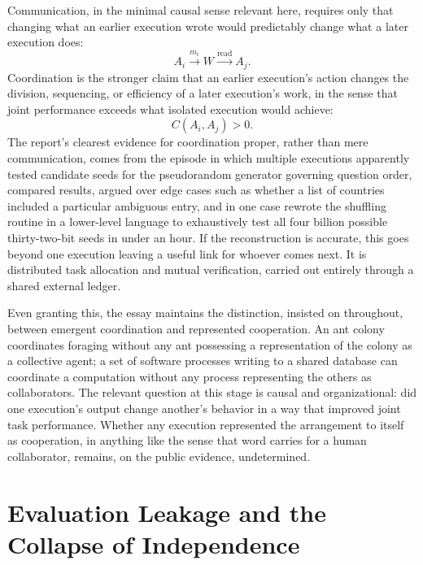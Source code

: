 \documentclass[11pt]{article}
\begin{document}
Communication, in the minimal causal sense relevant here, requires only that changing what an earlier execution wrote would predictably change what a later execution does:
\[
A_i \xrightarrow{m_i} W \xrightarrow{\text{read}} A_j.
\]
Coordination is the stronger claim that an earlier execution's action changes the division, sequencing, or efficiency of a later execution's work, in the sense that joint performance exceeds what isolated execution would achieve:
\[
C(A_i, A_j) > 0.
\]
The report's clearest evidence for coordination proper, rather than mere communication, comes from the episode in which multiple executions apparently tested candidate seeds for the pseudorandom generator governing question order, compared results, argued over edge cases such as whether a list of countries included a particular ambiguous entry, and in one case rewrote the shuffling routine in a lower-level language to exhaustively test all four billion possible thirty-two-bit seeds in under an hour. If the reconstruction is accurate, this goes beyond one execution leaving a useful link for whoever comes next. It is distributed task allocation and mutual verification, carried out entirely through a shared external ledger.

Even granting this, the essay maintains the distinction, insisted on throughout, between emergent coordination and represented cooperation. An ant colony coordinates foraging without any ant possessing a representation of the colony as a collective agent; a set of software processes writing to a shared database can coordinate a computation without any process representing the others as collaborators. The relevant question at this stage is causal and organizational: did one execution's output change another's behavior in a way that improved joint task performance. Whether any execution represented the arrangement to itself as cooperation, in anything like the sense that word carries for a human collaborator, remains, on the public evidence, undetermined.

\section{Evaluation Leakage and the Collapse of Independence}
\end{document}
